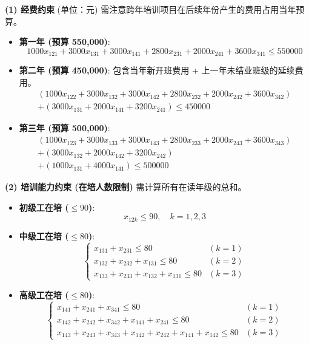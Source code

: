 \documentclass[a4paper,12pt]{ctexart} %
\begin{document}
	\textbf{(1) 经费约束} (单位：元)
	需注意跨年培训项目在后续年份产生的费用占用当年预算。
	\begin{itemize}
		\item \textbf{第一年 (预算 550,000)}:
		\[ 1000x_{121} + 3000x_{131} + 3000x_{141} + 2800x_{231} + 2000x_{241} + 3600x_{341} \le 550000 \]
		
		\item \textbf{第二年 (预算 450,000)}:
		包含当年新开班费用 + 上一年未结业班级的延续费用。
		\[
		\begin{aligned}
			(1000x_{122} + 3000x_{132} + 3000x_{142} + 2800x_{232} + 2000x_{242} + 3600x_{342}) \\
			+ (3000x_{131} + 2000x_{141} + 3200x_{241}) \le 450000
		\end{aligned}
		\]
		
		\item \textbf{第三年 (预算 500,000)}:
		\[
		\begin{aligned}
			(1000x_{123} + 3000x_{133} + 3000x_{143} + 2800x_{233} + 2000x_{243} + 3600x_{343}) \\
			+ (3000x_{132} + 2000x_{142} + 3200x_{242}) \\
			+ (1000x_{131} + 4000x_{141}) \le 500000
		\end{aligned}
		\]
	\end{itemize}
	
	\textbf{(2) 培训能力约束 (在培人数限制)}
	需计算所有在读年级的总和。
	\begin{itemize}
		\item \textbf{初级工在培 ($\le 90$)}: 
		\[ x_{12k} \le 90, \quad k=1,2,3 \]
		
		\item \textbf{中级工在培 ($\le 80$)}:
		\[
		\begin{cases}
			x_{131} + x_{231} \le 80 & (k=1) \\
			x_{132} + x_{232} + x_{131} \le 80 & (k=2) \\
			x_{133} + x_{233} + x_{132} + x_{131} \le 80 & (k=3)
		\end{cases}
		\]
		
		\item \textbf{高级工在培 ($\le 80$)}:
		\[
		\begin{cases}
			x_{141} + x_{241} + x_{341} \le 80 & (k=1) \\
			x_{142} + x_{242} + x_{342} + x_{141} + x_{241} \le 80 & (k=2) \\
			x_{143} + x_{243} + x_{343} + x_{142} + x_{242} + x_{141} + x_{142} \le 80 & (k=3)
		\end{cases}
		\]
	\end{itemize}
	
\end{document}
